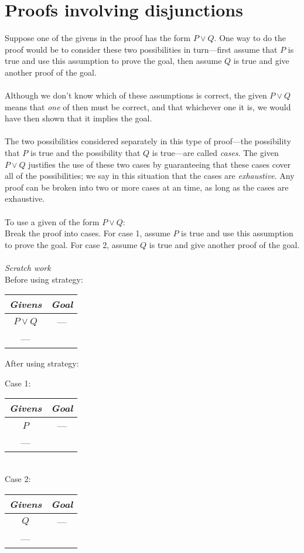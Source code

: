 \documentclass{report}
\theoremstyle{definition}
\begin{document}
\section{Proofs involving disjunctions}
Suppose one of the givens in the proof has the form $P\lor Q$. One way to do the proof would be to consider these two possibilities in turn---first assume that $P$ is true and use this 
assumption to prove the goal, then assume $Q$ is true and give another proof of the goal.\\
\vspace{1mm}\\
Although we don't know which of these assumptions is correct, the given $P\lor Q$ means that \textit{one} of then must be correct, and that whichever one it is, we would have then
shown that it implies the goal.\\
\vspace{1mm}\\
The two possibilities considered separately in this type of proof---the possibility that $P$ is true and the possibility that $Q$ is true---are called \textit{cases}. 
The given $P\lor Q$ justifies the use of these two cases by guaranteeing that these cases cover all of the possibilities; we say in this situation that the cases are \textit{exhaustive}. Any proof
can be broken into two or more cases at an time, as long as the cases are exhaustive.\\
\vspace{1mm}\\
\indent To use a given of the form $P\lor Q$:\\
\indent Break the proof into cases. For case 1, assume $P$ is true and use this assumption to prove the goal. For case 2, assume $Q$ is true and give another proof of the goal.\\
\vspace{1mm}\\
\textit{Scratch work}\\
Before using strategy:
\begin{center}
\begin{tabular}{c|c}
\textit{Givens}&\textit{Goal}\\
\hline
$P\lor Q$&---\\
---&
\end{tabular}
\end{center}
After using strategy:
\begin{center}Case 1:\quad
\begin{tabular}{c|c}
\textit{Givens}&\textit{Goal}\\
\hline
$P$&---\\
---&\\
\end{tabular}\\
Case 2:\quad
\begin{tabular}{c|c}
\textit{Givens}&\textit{Goal}\\
\hline
$Q$&---\\
---&\\
\end{tabular}
\end{center}
\end{document}
